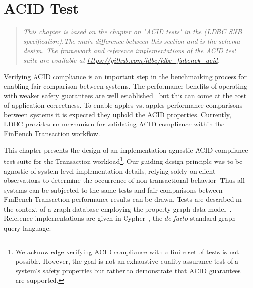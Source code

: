 \chapter{ACID Test}
\label{sec:acid-test}

\newcommand{\bl}[1]{\textcolor{blue}{#1}}
\newcommand{\rd}[1]{\textcolor{red}{#1}}
\newcommand{\gn}[1]{\textcolor{green}{#1}}
\newcommand{\gy}[1]{\textcolor{grey}{\textit{#1}}}

\newcommand{\level}[1]{\textsf{#1}}
\newcommand{\anomaly}[1]{\rd{#1}}
\newcommand{\anolong}[1]{\emph{\rd{#1}}}
\newcommand{\tx}[1]{#1}

\newcommand{\cmark}{\ding{51}}
\newcommand{\xmark}{\ding{55}}


\begin{quote}
  \textit{This chapter is based on the chapter on "ACID tests" in the
    \ldbcsnb(LDBC SNB specification).The main difference between
    this section and \ldbcsnb\xspace is the schema design. The
    framework and reference implementations of the ACID test suite
    are available at \url{https://github.com/ldbc/ldbc_finbench_acid}.
  }
\end{quote}

Verifying ACID compliance is an important step in the benchmarking process for
enabling fair comparison between systems. The performance benefits of operating
with weaker safety guarantees are well established~\cite{DBLP:conf/ds/GrayLPT76}
but this can come at the cost of application correctness. To enable apples vs.
apples performance comparisons between systems it is expected they uphold the
ACID properties. Currently, LDBC provides no mechanism for validating ACID
compliance within the FinBench Transaction workflow.

This chapter presents the design of an implementation-agnostic ACID-compliance
test suite for the Transaction workload\footnote{We acknowledge verifying
  ACID compliance with a finite set of tests is not possible. However, the goal is
  not an exhaustive quality assurance test of a system's safety properties but
  rather to demonstrate that ACID guarantees are supported.}. Our guiding design
principle was to be agnostic of system-level implementation details, relying
solely on client observations to determine the occurrence of non-transactional
behavior. Thus all systems can be subjected to the same tests and fair
comparisons between FinBench Transaction performance results can be drawn. Tests
are described in the context of a graph database employing the property graph data
model~\cite{DBLP:journals/csur/AnglesABHRV17}. Reference implementations are
given in Cypher~\cite{DBLP:conf/sigmod/FrancisGGLLMPRS18}, the \emph{de facto}
standard graph query language.

